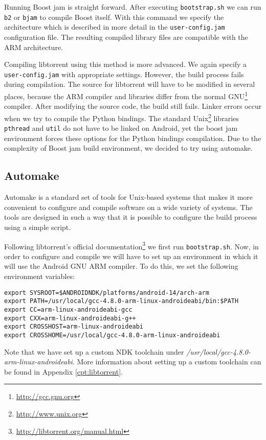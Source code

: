 		Running Boost jam is straight forward. After executing \texttt{bootstrap.sh} we can run \texttt{b2} or \texttt{bjam} to compile Boost itself. With this command we specify the architecture which is described in more detail in the \texttt{user-config.jam} configuration file. The resulting compiled library files are compatible with the ARM architecture.
		
		Compiling libtorrent using this method is more advanced. We again specify a \texttt{user-config.jam} with appropriate settings. However, the build process fails during compilation. The source for libtorrent will have to be modified in several places, because the ARM compiler and libraries differ from the normal GNU\footnote{\url{http://gcc.gnu.org}} compiler. After modifying the source code, the build still fails. Linker errors occur when we try to compile the Python bindings. The standard Unix\footnote{\url{http://www.unix.org}} libraries \texttt{pthread} and \texttt{util} do not have to be linked on Android, yet the boost jam environment forces these options for the Python bindings compilation. Due to the complexity of Boost jam build environment, we decided to try using automake.
		
		\subsection{Automake}
		Automake is a standard set of tools for Unix-based systems that makes it more convenient to configure and compile software on a wide variety of systems. The tools are designed in such a way that it is possible to configure the build process using a simple script.
		
		Following libtorrent's official documentation\footnote{\url{http://libtorrent.org/manual.html}} we first run \texttt{bootstrap.sh}. Now, in order to configure and compile we will have to set up an environment in which it will use the Android GNU ARM compiler. To do this, we set the following environment variables:
		
		\begin{lstlisting}
export SYSROOT=$ANDROIDNDK/platforms/android-14/arch-arm
export PATH=/usr/local/gcc-4.8.0-arm-linux-androideabi/bin:$PATH
export CC=arm-linux-androideabi-gcc
export CXX=arm-linux-androideabi-g++
export CROSSHOST=arm-linux-androideabi
export CROSSHOME=/usr/local/gcc-4.8.0-arm-linux-androideabi
		\end{lstlisting}
		
		Note that we have set up a custom NDK toolchain under \emph{/usr/local/gcc-4.8.0-arm-linux-androideabi}. More information about setting up a custom toolchain can be found in Appendix \ref{cpt:libtorrent}.
		
